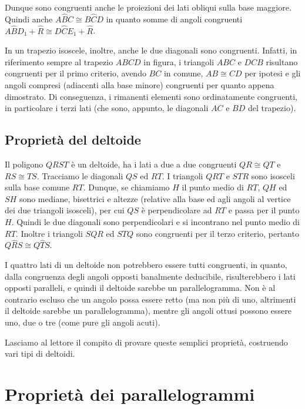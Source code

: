 Dunque sono congruenti  anche le proiezioni dei lati obliqui sulla base maggiore. 
Quindi anche $A\widehat{B}C\cong B\widehat{C}D$ in quanto somme di angoli congruenti $A\widehat{B}D_1+\widehat{R}\cong D\widehat{C}E_1+\widehat{R}$.

In un trapezio isoscele, inoltre, anche le due diagonali sono congruenti. Infatti, in riferimento sempre al trapezio $ABCD$ in figura, i triangoli $ABC$ e $DCB$ risultano congruenti per il primo criterio, avendo $BC$ in comune, $AB\cong CD$ per ipotesi e gli angoli compresi (adiacenti alla base minore) congruenti per quanto appena dimostrato. Di conseguenza, i rimanenti elementi sono ordinatamente congruenti, in particolare i terzi lati (che sono, appunto, le diagonali $AC$ e $BD$ del trapezio).

\subsection{Proprietà del deltoide}

Il poligono $QRST$ è un deltoide, ha i lati a due a due congruenti $QR\cong QT$ e $RS\cong TS$. Tracciamo le diagonali $QS$ ed $RT$. I triangoli $QRT$ e $STR$ sono isosceli sulla base comune $RT$. Dunque, se chiamiamo $H$ il punto medio di $RT$, $QH$ ed $SH$ sono mediane, bisettrici e altezze (relative alla base ed agli angoli al vertice dei due triangoli isosceli), per cui $QS$ è perpendicolare ad $RT$ e passa per il punto $H$. Quindi le due diagonali sono perpendicolari e si incontrano nel punto medio di $RT$. Inoltre i triangoli $SQR$ ed $STQ$ sono congruenti per il terzo criterio, pertanto $Q\widehat{R}S\cong Q\widehat{T}S$.

I quattro lati di un deltoide non potrebbero essere tutti congruenti, in quanto, dalla congruenza degli angoli opposti banalmente deducibile, risulterebbero i lati opposti paralleli, e quindi il deltoide sarebbe un parallelogramma. Non è al contrario escluso che un angolo possa essere retto (ma non più di uno, altrimenti il deltoide sarebbe un parallelogramma), mentre gli angoli ottusi possono essere uno, due o tre (come pure gli angoli acuti).

Lasciamo al lettore il compito di provare queste semplici proprietà, costruendo vari tipi di deltoidi.


\section{Proprietà dei parallelogrammi}

